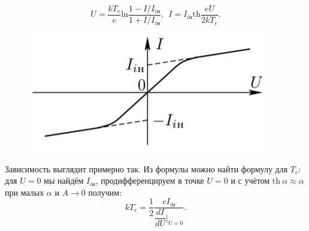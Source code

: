 \documentclass[a4paper, 12pt]{article}
\begin{document}
        \begin{equation}
                U = \dfrac{kT_e}{e}\text{ln}\dfrac{1 - I/I_{i\text{н}}}{1 + I/I_{i\text{н}}}, \ \
                I = I_{i\text{н}} \text{th}\dfrac{eU}{2kT_e}.
        \end{equation}
        \newpage
        \begin{figure}
                \includegraphics[scale=0.8]{4.png}
        \end{figure}
        Зависимость выглядит примерно так.
        Из формулы можно найти формулу для $T_e$: для $U=0$ мы найдём $I_{i\text{н}}$, продифференцируем в точке $U=0$ и с учётом $\text{th}~\alpha \approx \alpha$ при малых $\alpha$ и $A\rightarrow 0$ получим:
        \begin{equation}
                kT_e = \dfrac{1}{2}\dfrac{eI_{i\text{н}}}{\dfrac{dI}{dU}|_{U=0}}.
        \end{equation}
\end{document}
